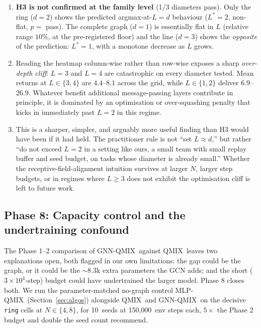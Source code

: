 \documentclass[manuscript, screen, review]{jair}
\newcommand{\algoname}[1]{\textsc{#1}}
\newcommand{\qmix}{\algoname{QMIX}}
\newcommand{\gnnqmix}{\algoname{GNN-QMIX}}
\newcommand{\mlpqmix}{\algoname{MLP-QMIX}}
\newcommand{\PEsteps}{150{,}000}      %
\newcommand{\PEseeds}{10}             %
\begin{document}
\begin{enumerate}[leftmargin=*,itemsep=0pt,topsep=2pt]
  \item \textbf{H3 is not confirmed at the family level} (1/3 diameters
        pass). Only the ring ($d=2$) shows the predicted argmax-at-$L=d$
        behaviour ($L^*=2$, non-flat, $p=$ pass). The complete graph
        ($d=1$) is essentially flat in $L$ (relative range $10\%$, at the
        pre-registered floor) and the line ($d=3$) shows the
        \emph{opposite} of the prediction: $L^*=1$, with a monotone
        decrease as $L$ grows.
  \item Reading the heatmap column-wise rather than row-wise exposes a
        sharp \emph{over-depth cliff}: $L=3$ and $L=4$ are catastrophic on
        every diameter tested. Mean returns at $L \in \{3, 4\}$ are
        $4.4$--$8.1$ across the grid, while $L \in \{1, 2\}$ deliver
        $6.9$--$26.9$. Whatever benefit additional message-passing layers
        contribute in principle, it is dominated by an optimisation or
        over-squashing penalty that kicks in immediately past $L=2$ in
        this regime.
  \item This is a sharper, simpler, and arguably more useful finding
        than H3 would have been if it had held. The practitioner rule
        is not ``set $L \approx d$,'' but rather ``do not exceed
        $L = 2$ in a setting like ours, a small team with small
        replay buffer and seed budget, on tasks whose diameter is
        already small.'' Whether the receptive-field-alignment intuition
        survives at larger $N$, larger step budgets, or in regimes where
        $L \ge 3$ does not exhibit the optimisation cliff is left to
        future work.
\end{enumerate}

\subsection{Phase 8: Capacity control and the undertraining confound}
\label{sec:results:capacity}

The Phase 1--2 comparison of \gnnqmix\ against \qmix\ leaves two
explanations open, both flagged in our own limitations: the gap could
be the graph, or it could be the ${\sim}8.3$k extra parameters the GCN
adds; and the short ($3\times10^4$-step) budget could have undertrained
the larger model. Phase 8 closes both. We run the parameter-matched
no-graph control \mlpqmix\ (Section~\ref{sec:algos}) alongside \qmix\
and \gnnqmix\ on the decisive \texttt{ring} cells at $N \in \{4, 8\}$,
for \PEseeds\ seeds at \PEsteps\ env steps each, $5\times$ the Phase 2
budget and double the seed count \citet{agarwal_2021_precipice}
recommend.
\end{document}
